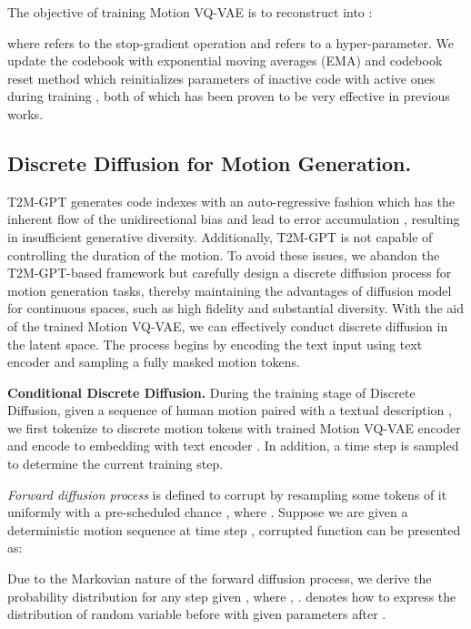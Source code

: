 \documentclass[letterpaper]{article} \usepackage{aaai24}
\begin{document}
The objective of training Motion VQ-VAE is  to reconstruct  into :

where  refers to the stop-gradient operation and  refers to a hyper-parameter. 
We update the codebook with exponential moving averages (EMA) and codebook reset method which reinitializes parameters of inactive code with active ones during training \cite{williams2020hierarchical, zhang2023t2mgpt}, both of which has been proven to be very effective in previous works\cite{zhang2023t2mgpt,razavi2019generating}.

\subsection{Discrete Diffusion for Motion Generation.}
T2M-GPT \cite{zhang2023t2mgpt} generates code indexes with an auto-regressive fashion which has the inherent flow of the unidirectional bias and lead to error accumulation \cite{sheng2019woman}, resulting in insufficient generative diversity. Additionally, T2M-GPT is not capable of controlling the duration of the motion. To avoid these issues, we abandon the T2M-GPT-based framework but carefully design a discrete diffusion process for motion generation tasks, thereby maintaining the advantages of diffusion model for continuous spaces, such as high fidelity and substantial diversity.
With the aid of the trained Motion VQ-VAE, we can effectively conduct discrete diffusion in the latent space. The process begins by encoding the text input  using text encoder and sampling a fully masked motion tokens.

\noindent\textbf{Conditional Discrete Diffusion.} During the training stage of Discrete Diffusion, given a sequence of human motion  paired with a textual description , we first tokenize  to discrete motion tokens  with trained Motion VQ-VAE encoder  and encode  to embedding  with text encoder . In addition, a time step  is sampled to determine the current training step.

\textit{Forward diffusion process}   is defined to corrupt  by resampling some tokens of it uniformly with a pre-scheduled chance , where . Suppose we are given a deterministic motion sequence  at time step , corrupted function  can be presented as:

Due to the Markovian nature of the forward diffusion process, we derive the probability distribution  for any step  given  
, where , .  denotes how to express the distribution of random variable before  with given parameters after .
\end{document}
